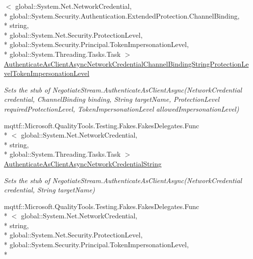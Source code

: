 \begin{DoxyCompactItemize}
$<$ global\-::\-System.\-Net.\-Network\-Credential, \\*
global\-::\-System.\-Security.\-Authentication.\-Extended\-Protection.\-Channel\-Binding, \\*
string, \\*
global\-::\-System.\-Net.\-Security.\-Protection\-Level, \\*
global\-::\-System.\-Security.\-Principal.\-Token\-Impersonation\-Level, \\*
global\-::\-System.\-Threading.\-Tasks.\-Task $>$ \hyperlink{class_system_1_1_net_1_1_security_1_1_fakes_1_1_stub_negotiate_stream_acc5765a60382f1421df0043262b988e6}{Authenticate\-As\-Client\-Async\-Network\-Credential\-Channel\-Binding\-String\-Protection\-Level\-Token\-Impersonation\-Level}
\begin{DoxyCompactList}\small\item\em Sets the stub of Negotiate\-Stream.\-Authenticate\-As\-Client\-Async(\-Network\-Credential credential, Channel\-Binding binding, String target\-Name, Protection\-Level required\-Protection\-Level, Token\-Impersonation\-Level allowed\-Impersonation\-Level)\end{DoxyCompactList}\item 
mqttf\-::\-Microsoft.\-Quality\-Tools.\-Testing.\-Fakes.\-Fakes\-Delegates.\-Func\\*
$<$ global\-::\-System.\-Net.\-Network\-Credential, \\*
string, \\*
global\-::\-System.\-Threading.\-Tasks.\-Task $>$ \hyperlink{class_system_1_1_net_1_1_security_1_1_fakes_1_1_stub_negotiate_stream_a0a6a03a299a26eb139ee75b6a81619bd}{Authenticate\-As\-Client\-Async\-Network\-Credential\-String}
\begin{DoxyCompactList}\small\item\em Sets the stub of Negotiate\-Stream.\-Authenticate\-As\-Client\-Async(\-Network\-Credential credential, String target\-Name)\end{DoxyCompactList}\item 
mqttf\-::\-Microsoft.\-Quality\-Tools.\-Testing.\-Fakes.\-Fakes\-Delegates.\-Func\\*
$<$ global\-::\-System.\-Net.\-Network\-Credential, \\*
string, \\*
global\-::\-System.\-Net.\-Security.\-Protection\-Level, \\*
global\-::\-System.\-Security.\-Principal.\-Token\-Impersonation\-Level, \\*

\end{DoxyCompactItemize}
